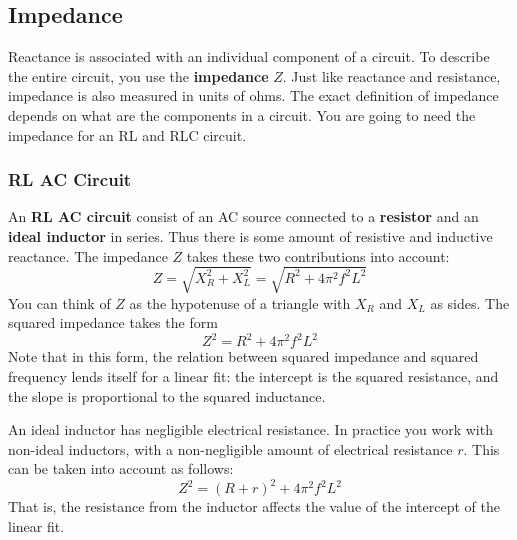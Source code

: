 \subsection{Impedance}
Reactance is associated with an individual component of a circuit. To describe the entire circuit, you use the \textbf{impedance} $Z$. Just like reactance and resistance, impedance is also measured in units of ohms. The exact definition of impedance depends on what are the components in a circuit. You are going to need the impedance for an RL and RLC circuit.
\subsubsection{RL AC Circuit}
An \textbf{RL AC circuit} consist of an AC source connected to a \textbf{resistor} and an \textbf{ideal inductor} in series. Thus there is some amount of resistive and inductive reactance. The impedance $Z$ takes these two contributions into account:
\begin{equation} \label{eq.06.impedance.RL}
	Z = \sqrt{X_{R}^{2} + X_{L}^{2}} = \sqrt{R^{2} + 4 \pi^{2} f^{2} L^{2}}
\end{equation}
You can think of $Z$ as the hypotenuse of a triangle with $X_{R}$ and $X_{L}$ as sides. The squared impedance takes the form
\begin{equation} \label{eq.06.impedance.squared}
	Z^{2} = R^{2} + 4\pi^{2} f^{2} L^{2}
\end{equation}
Note that in this form, the relation between squared impedance and squared frequency lends itself for a linear fit: the intercept is the squared resistance, and the slope is proportional to the squared inductance.

An ideal inductor has negligible electrical resistance. In practice you work with non-ideal inductors, with a non-negligible amount of electrical resistance $r$. This can be taken into account as follows:
\begin{equation}
	Z^{2} = (R + r)^{2} + 4 \pi^{2} f^{2} L^{2}
\end{equation}
That is, the resistance from the inductor affects the value of the intercept of the linear fit.
